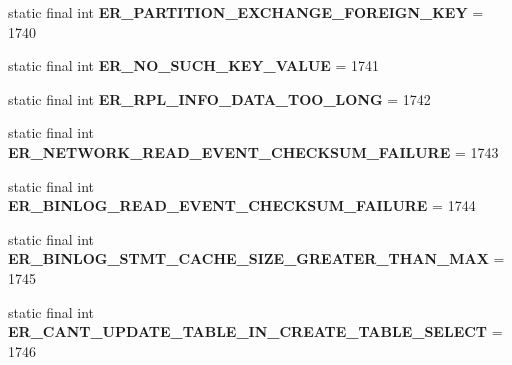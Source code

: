 \begin{DoxyCompactItemize}
static final int {\bfseries E\+R\+\_\+\+P\+A\+R\+T\+I\+T\+I\+O\+N\+\_\+\+E\+X\+C\+H\+A\+N\+G\+E\+\_\+\+F\+O\+R\+E\+I\+G\+N\+\_\+\+K\+EY} = 1740
\item 
\mbox{\label{classcom_1_1mysql_1_1cj_1_1exceptions_1_1_mysql_error_numbers_a7da7e17869d7ed834ae7043eea425d97}} 
static final int {\bfseries E\+R\+\_\+\+N\+O\+\_\+\+S\+U\+C\+H\+\_\+\+K\+E\+Y\+\_\+\+V\+A\+L\+UE} = 1741
\item 
\mbox{\label{classcom_1_1mysql_1_1cj_1_1exceptions_1_1_mysql_error_numbers_adcd03a58f98cc354c59b238f29b19140}} 
static final int {\bfseries E\+R\+\_\+\+R\+P\+L\+\_\+\+I\+N\+F\+O\+\_\+\+D\+A\+T\+A\+\_\+\+T\+O\+O\+\_\+\+L\+O\+NG} = 1742
\item 
\mbox{\label{classcom_1_1mysql_1_1cj_1_1exceptions_1_1_mysql_error_numbers_a39e0a8888e7461738c0cf21debbd6e5d}} 
static final int {\bfseries E\+R\+\_\+\+N\+E\+T\+W\+O\+R\+K\+\_\+\+R\+E\+A\+D\+\_\+\+E\+V\+E\+N\+T\+\_\+\+C\+H\+E\+C\+K\+S\+U\+M\+\_\+\+F\+A\+I\+L\+U\+RE} = 1743
\item 
\mbox{\label{classcom_1_1mysql_1_1cj_1_1exceptions_1_1_mysql_error_numbers_ab41671fbbbd5c4888e65a284d1deaf92}} 
static final int {\bfseries E\+R\+\_\+\+B\+I\+N\+L\+O\+G\+\_\+\+R\+E\+A\+D\+\_\+\+E\+V\+E\+N\+T\+\_\+\+C\+H\+E\+C\+K\+S\+U\+M\+\_\+\+F\+A\+I\+L\+U\+RE} = 1744
\item 
\mbox{\label{classcom_1_1mysql_1_1cj_1_1exceptions_1_1_mysql_error_numbers_ab42d104c1439ce9a126842e4ea4c9206}} 
static final int {\bfseries E\+R\+\_\+\+B\+I\+N\+L\+O\+G\+\_\+\+S\+T\+M\+T\+\_\+\+C\+A\+C\+H\+E\+\_\+\+S\+I\+Z\+E\+\_\+\+G\+R\+E\+A\+T\+E\+R\+\_\+\+T\+H\+A\+N\+\_\+\+M\+AX} = 1745
\item 
\mbox{\label{classcom_1_1mysql_1_1cj_1_1exceptions_1_1_mysql_error_numbers_af859c6bc8795cc88b5042b24d8e5021d}} 
static final int {\bfseries E\+R\+\_\+\+C\+A\+N\+T\+\_\+\+U\+P\+D\+A\+T\+E\+\_\+\+T\+A\+B\+L\+E\+\_\+\+I\+N\+\_\+\+C\+R\+E\+A\+T\+E\+\_\+\+T\+A\+B\+L\+E\+\_\+\+S\+E\+L\+E\+CT} = 1746

\end{DoxyCompactItemize}
